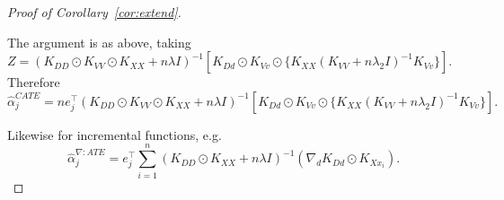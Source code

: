 \begin{proof}[Proof of Corollary~\ref{cor:extend}]
\begin{enumerate}
    The argument is as above, taking $Z=(K_{DD}\odot K_{VV}\odot K_{XX} +n\lambda  I )^{-1}[K_{Dd}\odot K_{Vv}\odot \{K_{XX}(K_{VV}+n\lambda_2  I )^{-1}K_{Vv} \}]$. Therefore
     $$
    \hat{\alpha}_j^{CATE}=ne_j^{\top}(K_{DD}\odot K_{VV}\odot K_{XX} +n\lambda  I )^{-1}[K_{Dd}\odot K_{Vv}\odot \{K_{XX}(K_{VV}+n\lambda_2  I )^{-1}K_{Vv} \}].
     $$
\end{enumerate}
Likewise for incremental functions, e.g.
$$
\hat{\alpha}_j^{\nabla:ATE}=e_j^{\top}\sum_{i=1}^n(K_{DD}\odot K_{XX}+n\lambda  I )^{-1}(\nabla_dK_{Dd}\odot K_{Xx_{i}}).
$$

\end{proof}




